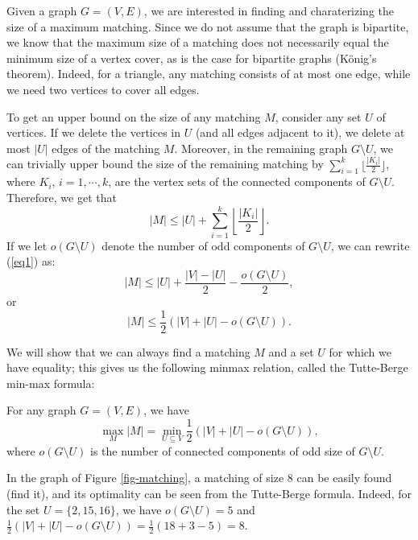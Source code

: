 \documentclass[12pt]{article}
\begin{document}

Given a graph $G=(V,E)$, we are interested in finding and
charaterizing the size of a maximum matching. Since we do not assume that
the graph is bipartite, we know that the maximum size of a matching
does not necessarily equal the minimum size of a vertex cover, as is
the case for bipartite graphs (K\"onig's theorem). Indeed, for a
triangle, any matching consists of at most one edge, while we need two
vertices to cover all edges. 

To get an upper bound on the size of any matching $M$, consider any set
$U$ of vertices. If we delete the vertices in $U$ (and all edges
adjacent to it), we delete at most $|U|$ edges of the matching
$M$. Moreover, in the remaining graph $G\setminus U$, we can trivially
upper bound the size of the remaining matching by $\sum_{i=1}^k \lfloor
\frac{|K_i|}{2} \rfloor$, where $K_i$, $i=1,\cdots,k$, are the vertex
sets of the connected components of $G\setminus U$. Therefore, we get
that 
\begin{equation} \label{eq1}
|M| \leq |U| +  \sum_{i=1}^k \left\lfloor
\frac{|K_i|}{2} \right\rfloor.\end{equation}
If we let $o(G\setminus U)$ denote the number of odd components of
$G\setminus U$, we can rewrite (\ref{eq1}) as:
$$ |M| \leq |U| +\frac{|V|-|U|}{2} -\frac{o(G\setminus U)}{2},$$
or
\begin{equation} \label{eq2}
|M| \leq \frac{1}{2} \left( |V| + |U| -o(G\setminus U) \right).
\end{equation}

We will show that we can always find a matching $M$ and a set $U$ for which
we have equality; this gives us the following minmax relation, called
the Tutte-Berge min-max formula:
\begin{theorem} \label{tutte}
For any graph $G=(V,E)$,  we have 
$$\max_M |M| = \min_{U\subseteq V}
 \frac{1}{2} \left( |V| + |U| -o(G\setminus U) \right),
$$
where $o(G\setminus U)$ is the number of connected components of odd
size of $G\setminus U$.
\end{theorem}

 In the graph of Figure \ref{fig-matching}, a
matching of size 8 can be easily found (find it), and its optimality
can be seen from the Tutte-Berge formula. Indeed, for the set
$U=\{2,15,16\}$, we have $o(G\setminus U)=5$ and
$\frac{1}{2}(|V|+|U|-o(G\setminus U))=\frac{1}{2} (18+3-5)=8$. 
\end{document}

